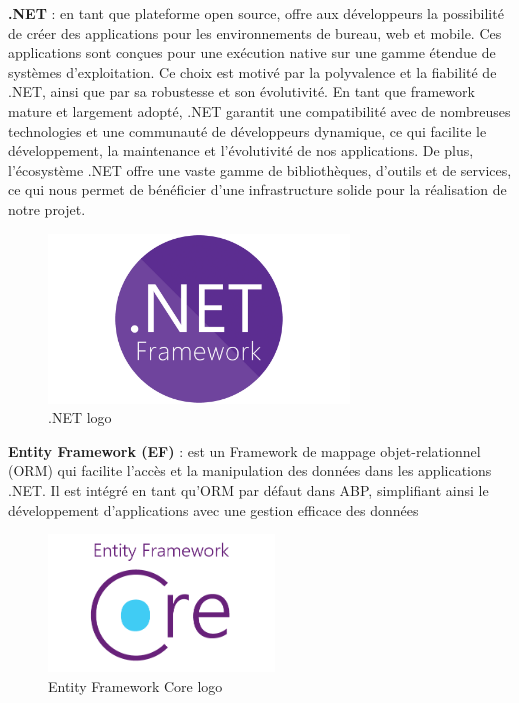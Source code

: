 \textbf{.NET} : en tant que plateforme open source, offre aux développeurs la possibilité de créer des applications pour les environnements de bureau, web et mobile. Ces applications sont conçues pour une exécution native sur une gamme étendue de systèmes d'exploitation. Ce choix est motivé par la polyvalence et la fiabilité de .NET, ainsi que par sa robustesse et son évolutivité. En tant que framework mature et largement adopté, .NET garantit une compatibilité avec de nombreuses technologies et une communauté de développeurs dynamique, ce qui facilite le développement, la maintenance et l'évolutivité de nos applications. De plus, l'écosystème .NET offre une vaste gamme de bibliothèques, d'outils et de services, ce qui nous permet de bénéficier d'une infrastructure solide pour la réalisation de notre projet.
\\
\begin{figure}[H]
    \centering
    \includegraphics[width=8cm]{Figures/dotnet.png}
    \caption{.NET logo}
\end{figure}




\textbf{Entity Framework (EF)} : est un Framework de mappage objet-relationnel (ORM) qui facilite l'accès et la manipulation des données dans les applications .NET. Il est intégré en tant qu'ORM par défaut dans ABP, simplifiant ainsi le développement d'applications avec une gestion efficace des données
\\
\begin{figure}[H]
    \centering
    \includegraphics[width=6cm]{Figures/efcore.png}
    \caption{Entity Framework Core logo}
\end{figure}


